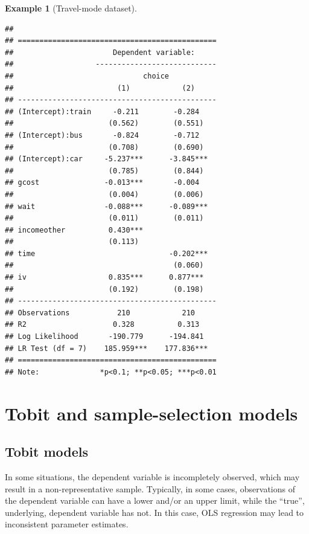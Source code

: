 \documentclass[
  12pt,
]{book}
\theoremstyle{definition}
\theoremstyle{definition}
\newtheorem{example}{Example}[chapter]
\theoremstyle{definition}
\theoremstyle{definition}
\theoremstyle{remark}
\begin{document}
\begin{example}[Travel-mode dataset]
\begin{verbatim}
## 
## ==============================================
##                       Dependent variable:     
##                   ----------------------------
##                              choice           
##                        (1)            (2)     
## ----------------------------------------------
## (Intercept):train     -0.211        -0.284    
##                      (0.562)        (0.551)   
## (Intercept):bus       -0.824        -0.712    
##                      (0.708)        (0.690)   
## (Intercept):car     -5.237***      -3.845***  
##                      (0.785)        (0.844)   
## gcost               -0.013***       -0.004    
##                      (0.004)        (0.006)   
## wait                -0.088***      -0.089***  
##                      (0.011)        (0.011)   
## incomeother          0.430***                 
##                      (0.113)                  
## time                               -0.202***  
##                                     (0.060)   
## iv                   0.835***      0.877***   
##                      (0.192)        (0.198)   
## ----------------------------------------------
## Observations           210            210     
## R2                    0.328          0.313    
## Log Likelihood       -190.779      -194.841   
## LR Test (df = 7)    185.959***    177.836***  
## ==============================================
## Note:              *p<0.1; **p<0.05; ***p<0.01
\end{verbatim}

\end{example}

\hypertarget{tobit-and-sample-selection-models}{%
\chapter{Tobit and sample-selection models}\label{tobit-and-sample-selection-models}}

\hypertarget{tobit}{%
\section{Tobit models}\label{tobit}}

In some situations, the dependent variable is incompletely observed, which may result in a non-representative sample. Typically, in some cases, observations of the dependent variable can have a lower and/or an upper limit, while the ``true'', underlying, dependent variable has not. In this case, OLS regression may lead to inconsistent parameter estimates.
\end{document}
